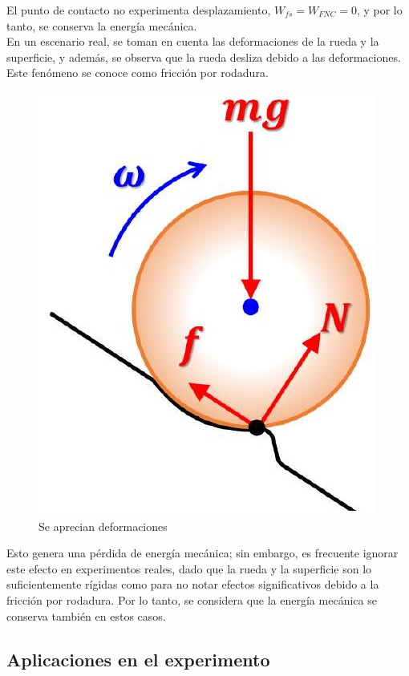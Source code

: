 \documentclass[10pt]{article}
\begin{document}
El punto de contacto no experimenta desplazamiento, $W_{f s} = W_{F N C} = 0$, y por lo tanto, se conserva la energía mecánica.\\
En un escenario real, se toman en cuenta las deformaciones de la rueda y la superficie, y además, se observa que la rueda desliza debido a las deformaciones. Este fenómeno se conoce como fricción por rodadura.\\
\begin{figure}[H]
    \centering
\includegraphics[scale = 0.30, center]{2025_04_01_ea720b93e8ebb5d0c6aeg-09}
\caption{Se aprecian deformaciones}
\end{figure}


Esto genera una pérdida de energía mecánica; sin embargo, es frecuente ignorar este efecto en experimentos reales, dado que la rueda y la superficie son lo suficientemente rígidas como para no notar efectos significativos debido a la fricción por rodadura. Por lo tanto, se considera que la energía mecánica se conserva también en estos casos.

\subsection{Aplicaciones en el experimento}
\end{document}
